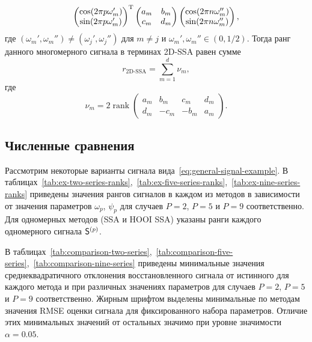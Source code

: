 \documentclass[specialist,
    substylefile = spbu_report.rtx,
    subf,href,colorlinks=true, 12pt]{disser}
\theoremstyle{plain}
\theoremstyle{definition}
\newtheorem{example}{Пример}[section]
\theoremstyle{remark}
\begin{document}
\begin{description}
\[\begin{pmatrix}
                \cos(2\pi p\omega_m') \\
                \sin(2\pi p\omega_m')
            \end{pmatrix}^{\mathrm{T}}
            \begin{pmatrix}
                a_m & b_m \\
                c_m & d_m
            \end{pmatrix}
            \begin{pmatrix}
                \cos(2\pi n\omega_m'') \\
                \sin(2\pi n\omega_m'')
            \end{pmatrix},
        \]
        где $(\omega_m', \omega_m'') \ne (\omega_j', \omega_j'')$ для $m\ne j$ и $\omega_m', \omega_m'' \in (0, 1/2)$.
        Тогда ранг данного многомерного сигнала в терминах 2D-SSA равен сумме
        \[
            r_\text{2D-SSA} = \sum_{m=1}^{d} \nu_m,
        \]
        где
        \[
            \nu_m = 2\operatorname{rank}\begin{pmatrix}
                                            a_m & b_m  & c_m  & d_m \\
                                            d_m & -c_m & -b_m & a_m
            \end{pmatrix}.
        \]
    \end{description}

    \subsection{Численные сравнения}\label{subsec:numerical-comp}
    Рассмотрим некоторые варианты сигнала вида~\eqref{eq:general-signal-example}.
    В таблицах~\ref{tab:ex-two-series-ranks},~\ref{tab:ex-five-series-ranks},~\ref{tab:ex-nine-series-ranks}
    приведены значения рангов сигналов в каждом из методов в зависимости от значения параметров $\omega_p$, $\psi_p$
    для случаев $P=2$, $P=5$ и $P=9$
    соответственно.
    Для одномерных методов (SSA и HOOI SSA) указаны ранги каждого одномерного сигнала $\mathsf{S}^{(p)}$.

    В таблицах~\ref{tab:comparison-two-series},~\ref{tab:comparison-five-series},~\ref{tab:comparison-nine-series}
    приведены минимальные значения среднеквадратичного отклонения
    восстановленного сигнала от истинного для каждого метода и при различных значениях параметров
    для случаев $P=2$, $P=5$ и $P=9$
    соответственно.
    Жирным шрифтом выделены минимальные по методам значения RMSE оценки сигнала
    для фиксированного набора параметров.
    Отличие этих минимальных значений от остальных значимо при уровне значимости $\alpha=0.05$.
\end{document}
